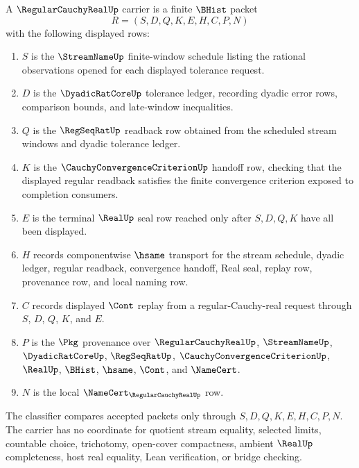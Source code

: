\begin{definition}
\label{def:regular-cauchy-real-carrier}
A $\RegularCauchyRealUp$ carrier is a finite $\BHist$ packet
$$
R=(S,D,Q,K,E,H,C,P,N)
$$
with the following displayed rows:
\begin{enumerate}
\item $S$ is the $\StreamNameUp$ finite-window schedule listing the rational observations opened for each displayed tolerance request.
\item $D$ is the $\DyadicRatCoreUp$ tolerance ledger, recording dyadic error rows, comparison bounds, and late-window inequalities.
\item $Q$ is the $\RegSeqRatUp$ readback row obtained from the scheduled stream windows and dyadic tolerance ledger.
\item $K$ is the $\CauchyConvergenceCriterionUp$ handoff row, checking that the displayed regular readback satisfies the finite convergence criterion exposed to completion consumers.
\item $E$ is the terminal $\RealUp$ seal row reached only after $S,D,Q,K$ have all been displayed.
\item $H$ records componentwise $\hsame$ transport for the stream schedule, dyadic ledger, regular readback, convergence handoff, Real seal, replay row, provenance row, and local naming row.
\item $C$ records displayed $\Cont$ replay from a regular-Cauchy-real request through $S$, $D$, $Q$, $K$, and $E$.
\item $P$ is the $\Pkg$ provenance over $\RegularCauchyRealUp$, $\StreamNameUp$, $\DyadicRatCoreUp$, $\RegSeqRatUp$, $\CauchyConvergenceCriterionUp$, $\RealUp$, $\BHist$, $\hsame$, $\Cont$, and $\NameCert$.
\item $N$ is the local $\NameCert_{\RegularCauchyRealUp}$ row.
\end{enumerate}
The classifier compares accepted packets only through $S,D,Q,K,E,H,C,P,N$. The carrier has no coordinate for quotient stream equality, selected limits, countable choice, trichotomy, open-cover compactness, ambient $\RealUp$ completeness, host real equality, Lean verification, or bridge checking.
\end{definition}

